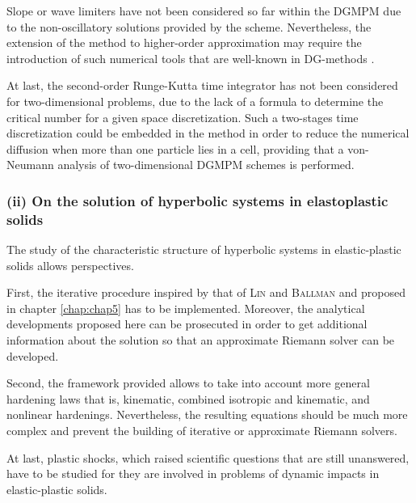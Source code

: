 Slope or wave limiters have not been considered so far within the DGMPM due to the non-oscillatory solutions provided by the scheme.
Nevertheless, the extension of the method to higher-order approximation may require the introduction of such numerical tools that are well-known in DG-methods \cite{Cockburn}.

At last, the second-order Runge-Kutta time integrator has not been considered for two-dimensional problems, due to the lack of a formula to determine the critical  number for a given space discretization.
Such a two-stages time discretization could be embedded in the method in order to reduce the numerical diffusion when more than one particle lies in a cell, providing that a von-Neumann analysis of two-dimensional DGMPM schemes is performed.


\subsubsection*{(ii) On the solution of hyperbolic systems in elastoplastic solids}
The study of the characteristic structure of hyperbolic systems in elastic-plastic solids allows perspectives.

First, the iterative procedure inspired by that of \textsc{Lin} and \textsc{Ballman} \cite{Lin_et_Ballman} and proposed in chapter \ref{chap:chap5} has to be implemented.
Moreover, the analytical developments proposed here can be prosecuted in order to get additional information about the solution so that an approximate Riemann solver can be developed.

Second, the framework provided allows to take into account more general hardening laws that is, kinematic, combined isotropic and kinematic, and nonlinear hardenings.
Nevertheless, the resulting equations should be much more complex and prevent the building of iterative or approximate Riemann solvers.

At last, plastic shocks, which raised scientific questions that are still unanswered, have to be studied for they are involved in problems of dynamic impacts in elastic-plastic solids.



